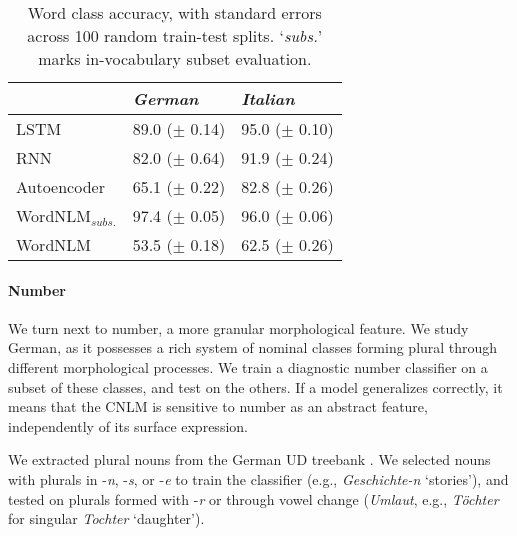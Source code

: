 \begin{table}[t]
\footnotesize
    \begin{center}
      \begin{tabular}{l|l|l}
        &\emph{German}&\emph{Italian}\\
        \hline
        LSTM & 89.0 ($\pm$ 0.14) & 95.0 ($\pm$ 0.10) \\
        RNN & 82.0 ($\pm$ 0.64) & 91.9 ($\pm$ 0.24) \\
        Autoencoder & 65.1 ($\pm$ 0.22) & 82.8 ($\pm$ 0.26) \\
	      WordNLM$_{\textit{subs.}}$ & 97.4 ($\pm$ 0.05) & 96.0 ($\pm$ 0.06) \\
	      WordNLM & 53.5 ($\pm$ 0.18)  & 62.5 ($\pm$ 0.26) \\
      \end{tabular}
    \end{center}
	\caption{\label{tab:pos-results} Word class accuracy, with standard errors across 100 random train-test splits. `\emph{subs.}' marks in-vocabulary subset evaluation.} %
\end{table}







\paragraph{Number}
We turn next to number, a more granular morphological feature. We
study German, as it possesses a rich system of nominal classes forming
plural through different morphological processes. We train a diagnostic number
classifier on a subset of these classes, and test on the others. If a
model generalizes correctly, it means that the CNLM is sensitive to number
as an abstract feature, independently of its surface expression.

We extracted plural nouns from the German UD
treebank \cite{mcdonald2013universal,brants2002tiger}.  We selected %
nouns with plurals in -\emph{n}, -\emph{s}, or -\emph{e} to train the classifier (e.g., \emph{Geschichte-n} `stories'), and tested on plurals formed with
-\emph{r} or through vowel change (\emph{Umlaut}, e.g., \emph{T{\"o}chter} for singular \emph{Tochter} `daughter').

